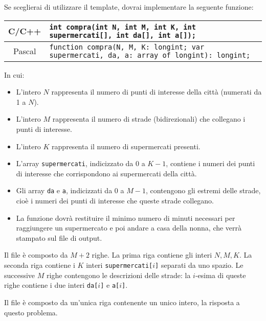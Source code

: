 Se sceglierai di utilizzare il template, dovrai implementare la seguente funzione:
\begin{center}\begin{tabularx}{\textwidth}{|c|X|}
\hline
C/C++  & {\verb|int compra(int N, int M, int K, int supermercati[], int da[], int a[]);|}\\
\hline
Pascal & \small{\verb|function compra(N, M, K: longint; var supermercati, da, a: array of longint): longint;|}\\
\hline
\end{tabularx}\end{center}
In cui:
\begin{itemize}[nolistsep]
  \item L'intero $N$ rappresenta il numero di punti di interesse della città (numerati da 1 a $N$).
  \item L'intero $M$ rappresenta il numero di strade (bidirezionali) che collegano i punti di interesse.
  \item L'intero $K$ rappresenta il numero di supermercati presenti.
  \item L'array \texttt{supermercati}, indicizzato da $0$ a $K-1$, contiene i numeri dei punti di interesse che corrispondono ai supermercati della città.
  \item Gli array \texttt{da} e \texttt{a}, indicizzati da $0$ a $M-1$, contengono gli estremi delle strade, cioè i numeri dei punti di interesse che queste strade collegano.
  \item La funzione dovrà restituire il minimo numero di minuti necessari per raggiungere un supermercato e poi andare a casa della nonna, che verrà stampato sul file di output.
\end{itemize}

\InputFile
Il file  è composto da $M+2$ righe. La prima riga contiene gli interi $N, M, K$. La seconda riga contiene i $K$ interi \texttt{supermercati[$i$]} separati da uno spazio. Le successive $M$ righe contengono le descrizioni delle strade: la $i$-esima di queste righe contiene i due interi \texttt{da[$i$]} e \texttt{a[$i$]}.

\OutputFile
Il file \outputfile{} è composto da un'unica riga contenente un unico intero, la risposta a questo problema.

